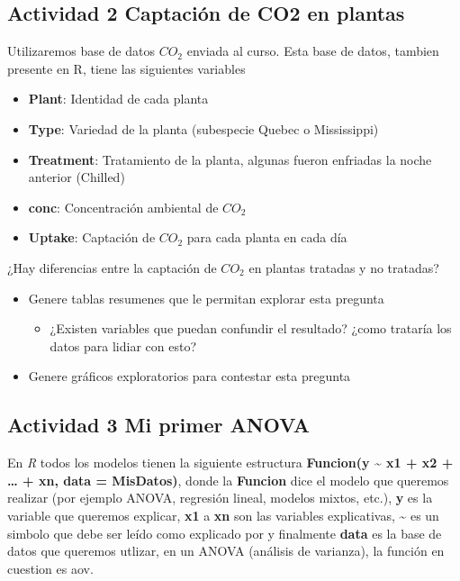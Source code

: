 \documentclass[]{article}
\providecommand{\tightlist}{%
  \setlength{\itemsep}{0pt}\setlength{\parskip}{0pt}}
\begin{document}
\subsection{Actividad 2 Captación de CO2 en
plantas}\label{actividad-2-captacion-de-co2-en-plantas}

Utilizaremos base de datos \(CO_2\) enviada al curso. Esta base de
datos, tambien presente en R, tiene las siguientes variables

\begin{itemize}
\tightlist
\item
  \textbf{Plant}: Identidad de cada planta
\item
  \textbf{Type}: Variedad de la planta (subespecie Quebec o Mississippi)
\item
  \textbf{Treatment}: Tratamiento de la planta, algunas fueron enfriadas
  la noche anterior (Chilled)
\item
  \textbf{conc}: Concentración ambiental de \(CO_2\)
\item
  \textbf{Uptake}: Captación de \(CO_2\) para cada planta en cada día
\end{itemize}

¿Hay diferencias entre la captación de \(CO_2\) en plantas tratadas y no
tratadas?

\begin{itemize}
\tightlist
\item
  Genere tablas resumenes que le permitan explorar esta pregunta

  \begin{itemize}
  \tightlist
  \item
    ¿Existen variables que puedan confundir el resultado? ¿como trataría
    los datos para lidiar con esto?
  \end{itemize}
\item
  Genere gráficos exploratorios para contestar esta pregunta
\end{itemize}

\subsection{Actividad 3 Mi primer
ANOVA}\label{actividad-3-mi-primer-anova}

En \emph{R} todos los modelos tienen la siguiente estructura
\textbf{Funcion(y \textasciitilde{} x1 + x2 + \ldots{} + xn, data =
MisDatos)}, donde la \textbf{Funcion} dice el modelo que queremos
realizar (por ejemplo ANOVA, regresión lineal, modelos mixtos, etc.),
\textbf{y} es la variable que queremos explicar, \textbf{x1} a
\textbf{xn} son las variables explicativas, \textbf{\textasciitilde{}}
es un simbolo que debe ser leído como explicado por y finalmente
\textbf{data} es la base de datos que queremos utlizar, en un ANOVA
(análisis de varianza), la función en cuestion es aov.
\end{document}
